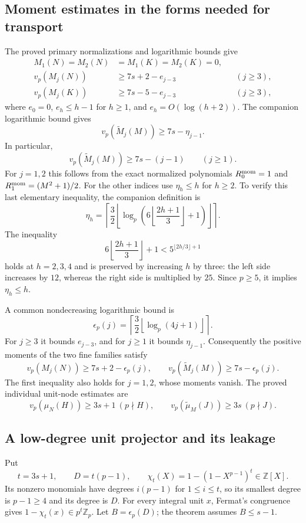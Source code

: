 \documentclass[11pt,letterpaper]{article}
\numberwithin{equation}{section}
\begin{document}
\subsection{Moment estimates in the forms needed for transport}
The proved primary normalizations and logarithmic bounds give
\begin{align}
 M_1(N)=M_2(N)&=M_1(K)=M_2(K)=0,\\
 v_p(M_j(N))&\ge7s+2-e_{j-3} &&(j\ge3),\\
 v_p(M_j(K))&\ge7s-5-e_{j-3} &&(j\ge3),
 \label{VII-eq:e-coarse-moment-bound}
\end{align}
where $e_0=0$, $e_h\le h-1$ for $h\ge1$, and $e_h=O(\log(h+2))$.
The companion logarithmic bound gives
\[
 v_p(\widetilde M_j(M))\ge7s-\eta_{j-1}.
\]
In particular,
\begin{equation}\label{VII-eq:e-companion-linear-loss}
 v_p(\widetilde M_j(M))\ge7s-(j-1)\qquad(j\ge1).
\end{equation}
For $j=1,2$ this follows from the exact normalized polynomials
$R_0^{\rm mom}=1$ and $R_1^{\rm mom}=(M^2+1)/2$. For the other
indices use $\eta_h\le h$ for $h\ge2$. To verify this last elementary
inequality, the companion definition is
\[
 \eta_h=\left\lceil\frac32
 \left\lfloor\log_p\left(6\left\lfloor\frac{2h+1}{3}\right\rfloor+1\right)
 \right\rfloor\right\rceil.
\]
The inequality
\[
 6\left\lfloor\frac{2h+1}{3}\right\rfloor+1
 <5^{\lfloor2h/3\rfloor+1}
\]
holds at $h=2,3,4$ and is preserved by increasing $h$ by three:
the left side increases by $12$, whereas the right side is multiplied
by $25$. Since $p\ge5$, it implies $\eta_h\le h$.

A common nondecreasing logarithmic bound is
\begin{equation}\label{VII-eq:e-common-loss}
 \epsilon_p(j)=\left\lceil\frac32\left\lfloor
                       \log_p(4j+1)\right\rfloor\right\rceil.
\end{equation}
For $j\ge3$ it bounds $e_{j-3}$, and for $j\ge1$ it bounds
$\eta_{j-1}$. Consequently the positive moments of the two fine
families satisfy
\[
 v_p(M_j(N))\ge7s+2-\epsilon_p(j),\qquad
 v_p(\widetilde M_j(M))\ge7s-\epsilon_p(j).
\]
The first inequality also holds for $j=1,2$, whose moments vanish.
The proved individual unit-node estimates are
\begin{equation}\label{VII-eq:e-unit-mass-bounds}
 v_p(\mu_N(H))\ge3s+1\ (p\nmid H),\qquad
 v_p(\widetilde\mu_M(J))\ge3s\ (p\nmid J).
\end{equation}

\subsection{A low-degree unit projector and its leakage}
Put
\[
 t=3s+1,\qquad D=t(p-1),\qquad
 \chi_t(X)=1-(1-X^{p-1})^t\in\mathbb Z[X].
\]
Its nonzero monomials have degrees $i(p-1)$ for $1\le i\le t$,
so its smallest degree is $p-1\ge4$ and its degree is $D$.
For every integral unit $x$, Fermat's congruence gives
$1-\chi_t(x)\in p^t\mathbb Z_p$.
Let $B=\epsilon_p(D)$; the theorem assumes $B\le s-1$.
\end{document}

